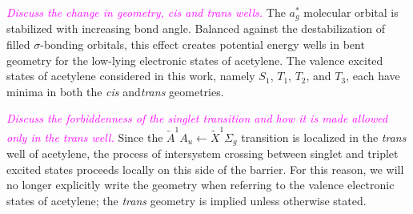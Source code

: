 \documentclass[12pt]{mitthesis}
\newcommand{\POINT}[1]{\textcolor{magenta}{\emph{#1}}}
\begin{document}
\POINT{Discuss the change in geometry, cis and trans wells.}  The
$a_g^*$ molecular orbital is stabilized with increasing  bond
angle.  Balanced against the destabilization of filled
$\sigma$-bonding orbitals, this effect creates potential energy wells
in bent geometry for the low-lying electronic states of acetylene.
The valence excited states of acetylene considered in this work,
namely $S_1$, $T_1$, $T_2$, and $T_3$, each have minima in both the
\emph{cis} and\emph{trans} geometries.

\POINT{Discuss the forbiddenness of the singlet transition and how it
  is made allowed only in the \emph{trans} well.}  Since the
$\tilde{A}^1A_u \leftarrow \tilde{X}^1\Sigma_g$ transition is
localized in the \emph{trans} well of acetylene, the process of
intersystem crossing between singlet and triplet excited states
proceeds locally on this side of the barrier.  For this reason, we
will no longer explicitly write the geometry when referring to the
valence electronic states of acetylene; the \emph{trans} geometry is
implied unless otherwise stated.
\end{document}
